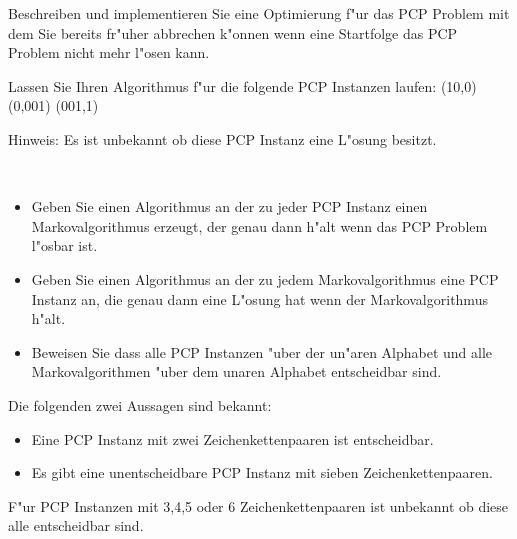 \documentclass[a4paper]{article}
\begin{document}
Beschreiben und implementieren Sie eine Optimierung f"ur das PCP Problem mit dem Sie bereits fr"uher abbrechen k"onnen wenn eine Startfolge das PCP Problem nicht mehr l"osen kann.

Lassen Sie Ihren Algorithmus f"ur die folgende PCP Instanzen laufen:
(10,0)   (0,001)    (001,1)

\noindent Hinweis: Es ist unbekannt ob diese PCP Instanz eine L"osung besitzt.

\bigskip

\bigskip

\\
\begin{itemize}
\item Geben Sie einen Algorithmus an der zu jeder PCP Instanz einen Markovalgorithmus erzeugt, der genau dann h"alt wenn das PCP Problem l"osbar ist.
\item Geben Sie einen Algorithmus an der zu jedem Markovalgorithmus eine PCP Instanz an, die genau dann eine  L"osung hat wenn der Markovalgorithmus h"alt.
\item Beweisen Sie dass alle PCP Instanzen "uber der un"aren Alphabet und alle Markovalgorithmen "uber dem unaren Alphabet entscheidbar sind.
\end{itemize}



\noindent Die folgenden zwei Aussagen sind bekannt:
\begin{itemize}
\item Eine PCP Instanz mit zwei Zeichenkettenpaaren ist entscheidbar.
\item Es gibt eine unentscheidbare PCP Instanz mit sieben Zeichenkettenpaaren.
\end{itemize}

\noindent F"ur PCP Instanzen mit 3,4,5 oder 6 Zeichenkettenpaaren ist unbekannt ob diese alle entscheidbar sind.
\end{document}
